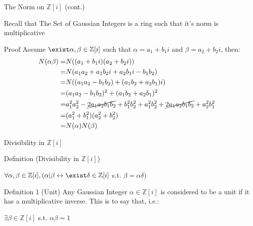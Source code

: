 \begin{frame}{The Norm on $\mathbb{Z}[i]$ (cont.)}
    

Recall that The Set of Gaussian Integers is a ring such that it's norm is multiplicative



\begin{block}{Proof}
Assume $\exist \alpha, \beta \in \mathbb{Z}[i]$ such that $\alpha = a_1 + b_1i$ and $\beta = a_2 + b_2i$, then:\\

\begin{align*}
    N(\alpha \beta) =& N((a_1 + b_1i)(a_2 + b_2i))\\
    =& N(a_1 a_2 + a_1 b_2 i + a_2 b_1 i - b_1 b_2)\\
    =& N((a_1 a_2 - b_1 b_2) + (a_1 b_2 + a_2 b_1)i)\\
    =& (a_1 a_2 - b_1 b_2)^2 + (a_1 b_2 + a_2 b_1)^2\\
    =& a_1^2 a_2^2 - \cancel{2a_1 a_2 b_1 b_2} + b_1^2 b_2^2 + a_1^2 b_2^2 + \cancel{2a_1 a_2 b_1 b_2} + a_2^2 b_1^2 \\
    =& (a_1^2 + b_1^2)(a_2^2 + b_2^2)\\
    =& N(\alpha)N(\beta)\\
\end{align*}
\end{block}
\end{frame}


\begin{frame}{Divisibility in $\mathbb{Z}[i]$}
    \begin{block}{Definition (Divisibility in $\mathbb{Z}[i]$)}
        \begin{center}
            $\forall \alpha, \beta \in \mathbb{Z}[i], (\alpha | \beta \leftrightarrow \exist \delta \in \mathbb{Z}[i] $ s.t. $ \beta = \alpha \delta)$
        \end{center}
    \end{block}
    
    \begin{block}{Definition 1 (Unit)}
        Any Gaussian Integer $\alpha \in \mathbb{Z}[i]$ is considered to be a unit if it has a multiplicative inverse. This is to say that, i.e.:\\
        \begin{center}
            $\exists \beta \in \mathbb{Z}[i]$ s.t. $\alpha \beta = 1$
        \end{center}
    \end{block}
\end{frame}



